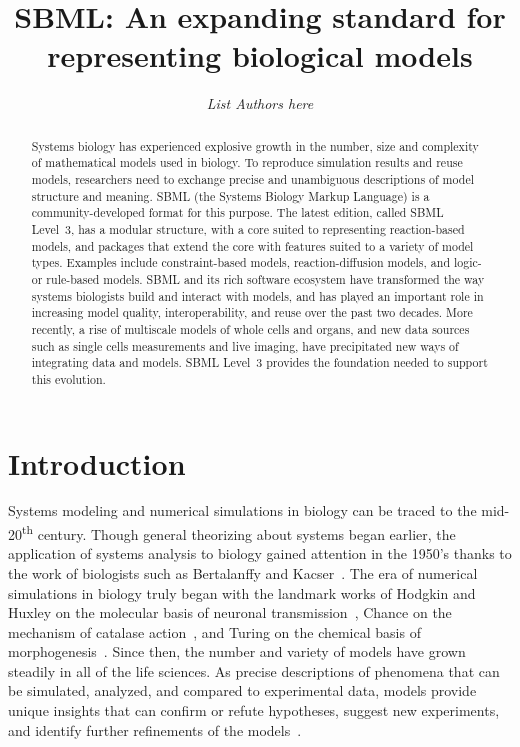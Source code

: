 \documentclass[]{draft-sbml-paper}
\title{SBML: An expanding standard for representing biological models}
\author[1]{\emph{List Authors here}}
\begin{document}
\maketitle

\begin{abstract}
Systems biology has experienced explosive growth in the number, size and complexity of mathematical models used in biology. To reproduce simulation results and reuse models, researchers need to exchange precise and unambiguous descriptions of model structure and meaning. SBML (the Systems Biology Markup Language) is a community-developed format for this purpose. The latest edition, called SBML Level~3, has a modular structure, with a core suited to representing reaction-based models, and packages that extend the core with features suited to a variety of model types. Examples include constraint-based models, reaction-diffusion models, and logic- or rule-based models. SBML and its rich software ecosystem have transformed the way systems biologists build and interact with models, and has played an important role in increasing model quality, interoperability, and reuse over the past two decades. More recently, a rise of multiscale models of whole cells and organs, and new data sources such as single cells measurements and live imaging, have precipitated new ways of integrating data and models. SBML Level~3 provides the foundation needed to support this evolution.
\end{abstract}

\clearpage

\section*{Introduction}

Systems modeling and numerical simulations in biology can be traced to the mid-20\textsuperscript{th} century. Though general theorizing about systems began earlier, the application of systems analysis to biology gained attention in the 1950's thanks to the work of biologists such as Bertalanffy and Kacser~\citep{Von_Bertalanffy1950-dy, Von_Bertalanffy1950-wa, Kacser1957-ox, kell2006theodor}. The era of numerical simulations in biology truly began with the landmark works of Hodgkin and Huxley on the molecular basis of neuronal transmission~\citep{hodgkin1952quantitative}, Chance on the mechanism of catalase action~\citep{chance1952mechanism}, and Turing on the chemical basis of morphogenesis~\citep{turing1990chemical}. Since then, the number and variety of models have grown steadily in all of the life sciences. As precise descriptions of phenomena that can be simulated, analyzed, and compared to experimental data, models provide unique insights that can confirm or refute hypotheses, suggest new experiments, and identify further refinements of the models~\citep{Heinrich1996, le_novere_2015}.
\end{document}
